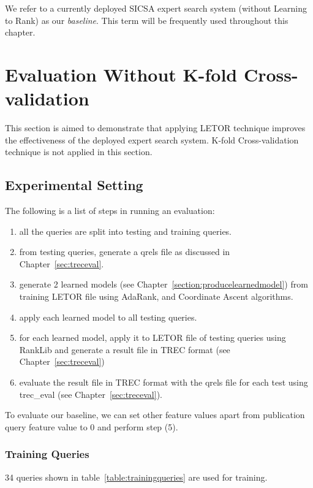 We refer to a currently deployed SICSA expert search system (without Learning to Rank) as our \textit{baseline}. This term will be frequently used 
throughout this chapter.

\section{Evaluation Without K-fold Cross-validation}\label{sec:withoutLETOR}
This section is aimed to demonstrate that applying LETOR technique improves the effectiveness of the deployed expert search system. 
K-fold Cross-validation technique is not applied in this section.

\subsection{Experimental Setting}
 The following is a list of steps in running an evaluation:
\begin{enumerate}
 \item all the queries are split into testing and training queries.
 \item from testing queries, generate a qrels file as discussed in Chapter~\ref{sec:treceval}.
 \item generate 2 learned models (see Chapter~\ref{section:producelearnedmodel}) from training LETOR file using AdaRank, and Coordinate Ascent algorithms.
 \item apply each learned model to all testing queries.
 \item for each learned model, apply it to LETOR file of testing queries using RankLib and generate a result file in TREC format (see Chapter~\ref{sec:treceval}) 
 \item evaluate the result file in TREC format with the qrels file for each test using trec\_eval (see Chapter~\ref{sec:treceval}).
\end{enumerate}

To evaluate our baseline, we can set other feature values apart from publication query feature value to 0 and perform step (5).

\subsubsection{Training Queries}
34 queries shown in table~\ref{table:trainingqueries} are used for training. 

